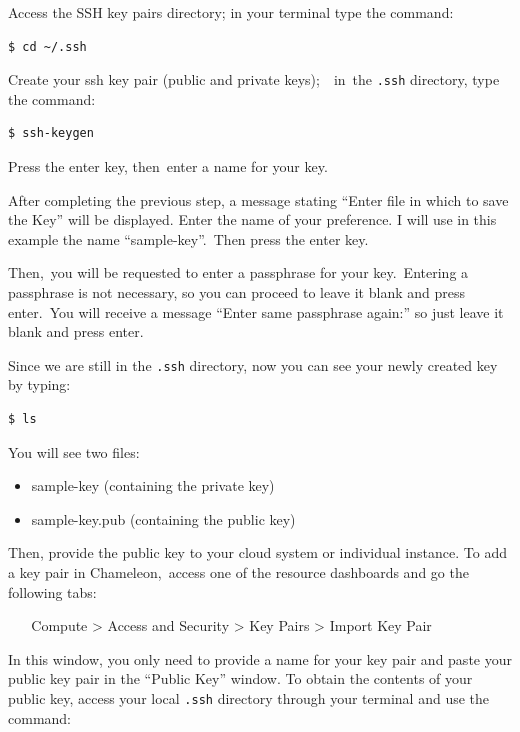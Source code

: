 Access the SSH key pairs directory; {i}n your terminal type the command:

\begin{verbatim}
$ cd ~/.ssh
\end{verbatim}

Create your ssh key pair (public and private keys);~~in~the
\texttt{.ssh} directory, type the command:

\begin{verbatim}
$ ssh-keygen
\end{verbatim}

Press the enter key, then~enter a name for your key.

After completing the previous step, a message stating ``Enter file in
which to save the Key'' will be displayed. Enter the name of your
preference. I will use in this example the name ``sample-key''.{~}Then
press the enter key.

{Then,~}you will be requested to enter a passphrase for your
key.~Entering a passphrase is not necessary, so you can proceed to leave
it blank and press enter.{~}You will receive a message ``Enter same
passphrase again:'' so just leave it blank and press enter.

Since we are still in the \texttt{.ssh} directory, now you can see your
newly created key by typing:

\begin{verbatim}
$ ls
\end{verbatim}

You will see two files:

\begin{itemize}
\tightlist
\item
  sample-key (containing the private key)
\item
  sample-key.pub (containing the public key)
\end{itemize}

Then, provide the public key to your cloud system or individual
instance. To add a key pair in Chameleon,~access one of the resource
dashboards and go the following tabs:

~ ~ Compute \textgreater{} Access and Security \textgreater{} Key Pairs
\textgreater{} Import Key Pair

In this window, you only need to provide a name for your key pair and
paste your public key pair in the ``Public Key'' window. To obtain the
contents of your public key, access your local \texttt{.ssh} directory
through your terminal and use the command:

